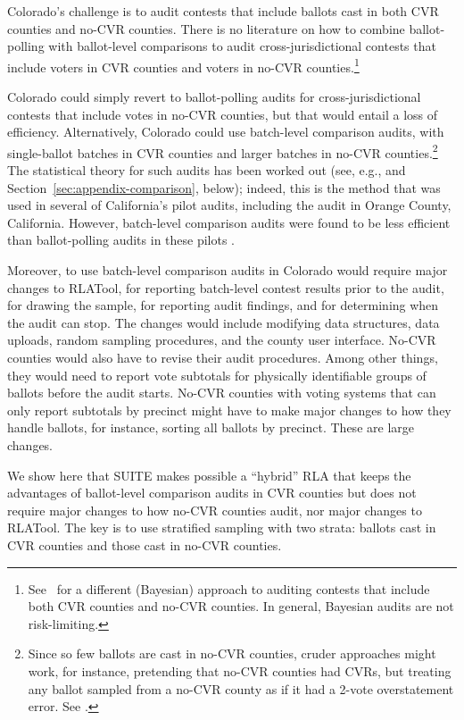 \documentclass[runningheads]{llncs}
\begin{document}
Colorado's challenge is to audit contests that include ballots cast in both CVR counties and no-CVR counties. There is no literature on how to combine ballot-polling with ballot-level comparisons to audit 
cross-jurisdictional contests 
that include voters in CVR counties and voters in no-CVR counties.\footnote{%
  See~\cite{Rivest-2018-bayesian-tabulation-audits}
  for a different (Bayesian) approach to auditing contests that include both CVR counties
  and no-CVR counties. In general, Bayesian audits are not risk-limiting.
}

Colorado could simply revert to ballot-polling audits for cross-jurisdictional contests that include votes in no-CVR counties, but that would entail a loss of efficiency.
Alternatively, Colorado could use batch-level comparison audits, with single-ballot batches in CVR counties and larger batches in no-CVR counties.\footnote{%
Since so few ballots are cast in no-CVR counties, cruder approaches might work, for instance, pretending that no-CVR counties had CVRs, but treating any ballot sampled from a no-CVR county as if it had a 2-vote overstatement error. See \cite{banuelosStark12}.
}
The statistical theory for such audits has been worked out (see, e.g., \cite{stark08a,stark09c,stark09b,stark10d} and Section~\ref{sec:appendix-comparison}, below); indeed, this is the method that was used in several of California's pilot audits, including the audit in Orange County, California.
However, batch-level comparison audits were found to be less efficient than ballot-polling audits in these pilots \cite{CA_SOS_EAC}.

Moreover, to use batch-level comparison audits in Colorado would require major changes to RLATool, for reporting batch-level contest results prior to the audit, for drawing the sample, for reporting audit findings, and for determining when the audit can stop. 
The changes would include modifying data structures, data uploads, random sampling procedures, and the county user interface.
No-CVR counties would also have to revise their audit procedures.
Among other things, they would need to report vote subtotals
for physically identifiable groups of ballots before the audit starts.
No-CVR counties with voting systems that can only report subtotals by precinct
might have to make major changes to how they handle ballots, for instance, sorting all ballots by precinct.
These are large changes.

We show here that SUITE makes possible a ``hybrid'' RLA that keeps the advantages of ballot-level comparison audits in CVR counties but does not require major changes to how no-CVR counties audit, nor major changes to RLATool. 
The key is to use stratified sampling with two strata: ballots cast in CVR counties and those cast in no-CVR counties.
\end{document}
